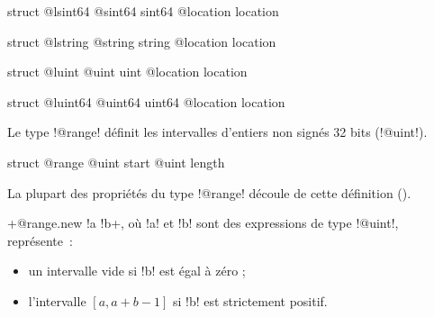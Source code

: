 \begin{galgas3}
struct @lsint64 {
  @sint64 sint64
  @location location
}
\end{galgas3}








\begin{galgas3}
struct @lstring {
  @string string
  @location location
}
\end{galgas3}








\begin{galgas3}
struct @luint {
  @uint uint
  @location location
}
\end{galgas3}







\begin{galgas3}
struct @luint64 {
  @uint64 uint64
  @location location
}
\end{galgas3}



Le type \ggst!@range! définit les intervalles d'entiers non signés 32 bits (\ggst!@uint!).

\begin{galgas3}
struct @range {
  @uint start
  @uint length
}
\end{galgas3}

La plupart des propriétés du type \ggst!@range! découle de cette définition ().

\ggst+@range.new {!a !b}+, où \ggst!a! et \ggst!b! sont des expressions de type \ggst!@uint!, représente~:
\begin{itemize}
  \item un intervalle vide si \ggst!b! est égal à zéro ;
  \item l'intervalle $[a, a+b-1]$ si \ggst!b! est strictement positif.
\end{itemize}




